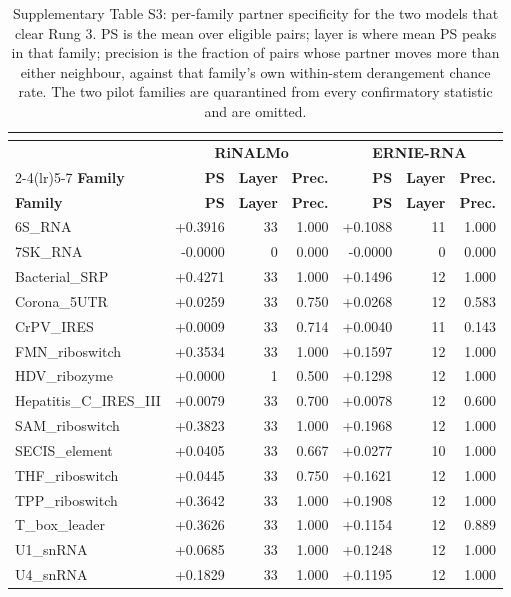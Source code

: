 \documentclass[11pt]{article}
\begin{document}
\begin{longtable}{@{}lrrrrrr@{}}
\caption{Supplementary Table S3: per-family partner specificity for the two models that clear Rung 3. PS is the mean over eligible pairs; layer is where mean PS peaks in that family; precision is the fraction of pairs whose partner moves more than either neighbour, against that family's own within-stem derangement chance rate. The two pilot families are quarantined from every confirmatory statistic and are omitted.}\\
\label{tab:s3}\\
\toprule
 & \multicolumn{3}{c}{\textbf{RiNALMo}} & \multicolumn{3}{c}{\textbf{ERNIE-RNA}} \\
\cmidrule(lr){2-4}\cmidrule(lr){5-7}
\textbf{Family} & \textbf{PS} & \textbf{Layer} & \textbf{Prec.} & \textbf{PS} & \textbf{Layer} & \textbf{Prec.} \\
\midrule
\endfirsthead
\toprule
\textbf{Family} & \textbf{PS} & \textbf{Layer} & \textbf{Prec.} & \textbf{PS} & \textbf{Layer} & \textbf{Prec.} \\
\midrule
\endhead
6S\_RNA & +0.3916 & 33 & 1.000 & +0.1088 & 11 & 1.000 \\
7SK\_RNA & -0.0000 & 0 & 0.000 & -0.0000 & 0 & 0.000 \\
Bacterial\_SRP & +0.4271 & 33 & 1.000 & +0.1496 & 12 & 1.000 \\
Corona\_5UTR & +0.0259 & 33 & 0.750 & +0.0268 & 12 & 0.583 \\
CrPV\_IRES & +0.0009 & 33 & 0.714 & +0.0040 & 11 & 0.143 \\
FMN\_riboswitch & +0.3534 & 33 & 1.000 & +0.1597 & 12 & 1.000 \\
HDV\_ribozyme & +0.0000 & 1 & 0.500 & +0.1298 & 12 & 1.000 \\
Hepatitis\_C\_IRES\_III & +0.0079 & 33 & 0.700 & +0.0078 & 12 & 0.600 \\
SAM\_riboswitch & +0.3823 & 33 & 1.000 & +0.1968 & 12 & 1.000 \\
SECIS\_element & +0.0405 & 33 & 0.667 & +0.0277 & 10 & 1.000 \\
THF\_riboswitch & +0.0445 & 33 & 0.750 & +0.1621 & 12 & 1.000 \\
TPP\_riboswitch & +0.3642 & 33 & 1.000 & +0.1908 & 12 & 1.000 \\
T\_box\_leader & +0.3626 & 33 & 1.000 & +0.1154 & 12 & 0.889 \\
U1\_snRNA & +0.0685 & 33 & 1.000 & +0.1248 & 12 & 1.000 \\
U4\_snRNA & +0.1829 & 33 & 1.000 & +0.1195 & 12 & 1.000 \\

\end{longtable}
\end{document}
